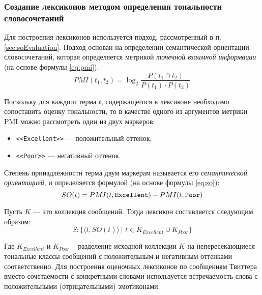     \lstset{style=python}
    


    \subsubsection{Создание лексиконов методом определения тональности словосочетаний}
    Для построения лексиконов используется подход, рассмотренный в п.
    \ref{sec:soEvaluation}.
    Подход основан на определении семантической ориентации словосочетаний, которая
    определяется метрикой {\it точечной взаимной информации} (на основе формулы
    \ref{eq:pmi}):
    \begin{equation}
        \label{eq:pmi2}
        PMI(t_1, t_2) = \log_2 \dfrac{P(t_1 \cap t_2)}{P(t_1) \cdot P(t_2)}
    \end{equation}

    Поскольку для каждого терма $t$, содержащегося в лексиконе необходимо
    сопоставить оценку тональности, то в качестве одного из аргументов метрики
    PMI можно рассмотреть один из двух маркеров:
    \begin{itemize}
        \item {\tt <<Excellent>>} --- положительный оттенок;
        \item {\tt <<Poor>>} --- негативный оттенок.
    \end{itemize}

    Степень принадлежности терма двум маркерам называется его {\it семантической
    ориентацией}, и определяется формулой (на основе формулы \ref{eq:so}):
    \begin{equation}
        SO(t) = PMI(t, {\tt Excellent}) - PMI(t, {\tt Poor})
    \end{equation}

    Пусть $K$ --- это коллекция сообщений. Тогда лексикон составляется следующим
    образом:
    \begin{equation}
        S : \{\langle t, SO(t) \rangle \hspace{2pt}| \hspace{4pt} t \in K_{Excellent} \cup K_{Poor}\}
    \end{equation}

    Где $K_{Excellent}$ и $K_{Poor}$ – разделение исходной коллекции $K$ на
    непересекающиеся тональные классы сообщений с положительным и негативным
    оттенками соответственно.  Для построения оценочных лексиконов по сообщениям
    Твиттера вместо сочетаемости с конкретными словами используется встречаемость
    слова с положительными (отрицательными) эмотиконами.

